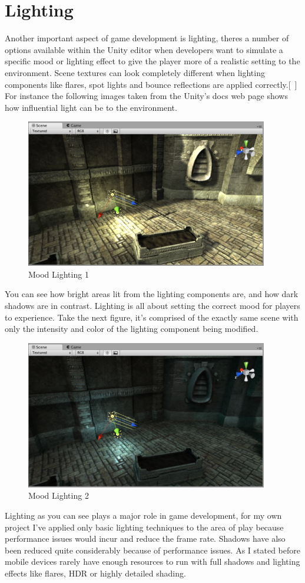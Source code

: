 \section{Lighting}
Another important aspect of game development is lighting, theres a number of options available within the Unity editor when developers want to simulate a specific mood or lighting effect to give the player more of a realistic setting to the environment. Scene textures can look completely different when lighting components like flares, spot lights and bounce reflections are applied correctly.[~\cite{Lighting}] For instance the following images taken from the Unity's docs web page shows how influential light can be to the environment.
\begin{figure}[!ht]
	\caption{Mood Lighting 1}
	\centering
	\includegraphics{img/light-mood-1.png}
\end{figure}
You can see how bright areas lit from the lighting components are, and how dark shadows are in contrast. Lighting is all about setting the correct mood for players to experience. Take the next figure, it's comprised of the exactly same scene with only the intensity and color of the lighting component being modified.
\begin{figure}[!ht]
	\caption{Mood Lighting 2}
	\centering
	\includegraphics{img/light-mood-2.png}
\end{figure}
Lighting as you can see plays a major role in game development, for my own project I've applied only basic lighting techniques to the area of play because performance issues would incur and reduce the frame rate. Shadows have also been reduced quite considerably because of performance issues. As I stated before mobile devices rarely have enough resources to run with full shadows and lighting effects like flares, HDR or highly detailed shading.
